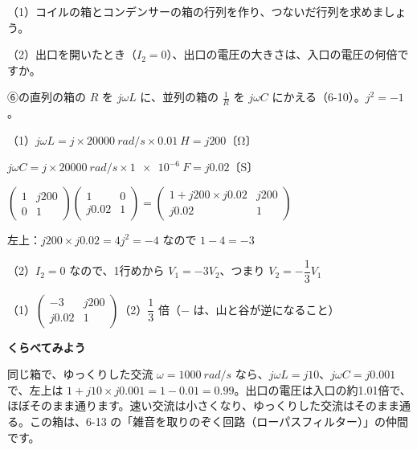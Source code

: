 \begin{reidai}[コイルとコンデンサーの箱]
（1）コイルの箱とコンデンサーの箱の行列を作り、つないだ行列を求めましょう。\par
（2）出口を開いたとき（$I_2=0$）、出口の電圧の大きさは、入口の電圧の何倍ですか。\par
\kangaekata ⑥の直列の箱の $R$ を $j\omega L$ に、並列の箱の $\frac1R$ を $j\omega C$ にかえる（6-10）。$j^2=-1$。\par
\shiki\kviids{}\zw{} （1）$j\omega L=j\times\qty{20000}{rad/s}\times\qty{0.01}{H}=j200$\quad 〔Ω〕\par
\kviidb $j\omega C=j\times\qty{20000}{rad/s}\times\qty{1e-6}{F}=j0.02$\quad 〔S〕\par
\kviidb $\begin{pmatrix}1&j200\\0&1\end{pmatrix}\begin{pmatrix}1&0\\j0.02&1\end{pmatrix}=\begin{pmatrix}1+j200\times j0.02&j200\\j0.02&1\end{pmatrix}$\par
\kviidb 左上：$j200\times j0.02=4j^2=-4$ なので $1-4=-3$\par
\kviida （2）$I_2=0$ なので、1行めから $V_1=-3V_2$、つまり $V_2=-\dfrac13V_1$\par
\kotae\kviids{}\zw{} （1）$\begin{pmatrix}-3&j200\\j0.02&1\end{pmatrix}$\quad （2）$\dfrac13$ 倍（$-$ は、山と谷が逆になること）\par\vspace{4pt}
\noindent\textbf{くらべてみよう}\par\noindent
同じ箱で、ゆっくりした交流 $\omega=\qty{1000}{rad/s}$ なら、$j\omega L=j10$、$j\omega C=j0.001$ で、左上は $1+j10\times j0.001=1-0.01=0.99$。出口の電圧は入口の約1.01倍で、ほぼそのまま通ります。速い交流は小さくなり、ゆっくりした交流はそのまま通る。この箱は、6-13 の「雑音を取りのぞく回路（ローパスフィルター）」の仲間です。
\end{reidai}

